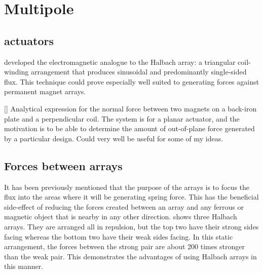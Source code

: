 
\chapter{Multipole}


\section{actuators}

\textcite{trumper1996} developed the electromagnetic analogue to the
Halbach array: a triangular coil-winding arrangement that produces
sinusoidal and predominantly single-sided flux. This technique could
prove especially well suited to generating forces against permanent
magnet arrays.


[\textcite{dasilveira2005}] Analytical expression for the normal force between two magnets on a back-iron plate and a perpendicular coil.
The system is for a planar actuator, and the motivation is to be able to determine the amount of out-of-plane force generated by a particular design.
Could very well be useful for some of my ideas.


\section{Forces between arrays}

It has been previously mentioned that the purpose of the arrays is to focus
the flux into the areas where it will be generating spring force. This has the
beneficial side-effect of reducing the forces created between an array and any
ferrous or magnetic object that is nearby in any other direction.
 shows three Halbach arrays. They are arranged all in
repulsion, but the top two have their strong sides facing whereas the bottom
two have their weak sides facing. In this static arrangement, the forces
between the strong pair are about 200 times stronger than the weak pair. This
demonstrates the advantages of using Halbach arrays in this manner.

